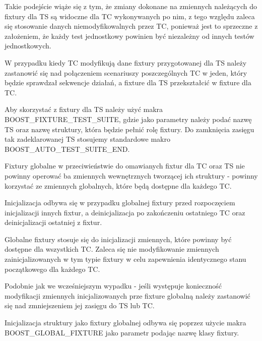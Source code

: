 \documentclass[12pt,a4paper,notitlepage]{report}
\begin{document}
Takie podejście wiąże się z tym, że zmiany dokonane na zmiennych należących do fixtury dla TS są widoczne dla TC wykonywanych po nim, z tego względu zaleca się stosowanie danych niemodyfikowalnych przez TC, ponieważ jest to sprzeczne z założeniem, że każdy test jednostkowy powinien być niezależny od innych testów jednostkowych.

W przypadku kiedy TC modyfikują dane fixtury przygotowanej dla TS należy zastanowić się nad połączeniem scenariuszy poszczególnych TC w jeden, który będzie sprawdzał sekwencje działań, a fixture dla TS przekształcić w fixture dla TC.

Aby skorzystać z fixtury dla TS należy użyć makra BOOST{\_}FIXTURE{\_}TEST{\_}SUITE, gdzie jako parametry należy podać nazwę TS oraz nazwę struktury, która będzie pełnić rolę fixtury. Do zamknięcia zasięgu tak zadeklarowanej TS stosujemy standardowe makro BOOST{\_}AUTO{\_}TEST{\_}SUITE{\_}END.

			

Fixtury globalne w przeciwieństwie do omawianych fixtur dla TC oraz TS nie powinny operować ba zmiennych wewnętrznych tworzącej ich struktury - powinny korzystać ze zmiennych globalnych, które będą dostępne dla każdego TC.

Inicjalizacja odbywa się w przypadku globalnej fixtury przed rozpoczęciem inicjalizacji innych fixtur, a deinicjalizacja po zakończeniu ostatniego TC oraz deinicjalizacji ostatniej z fixtur.

Globalne fixtury stosuje się do inicjalizacji zmiennych, które powinny być dostępne dla wszystkich TC. Zaleca się nie modyfikowanie zmiennych zainicjalizowanych w tym typie fixtury w celu zapewnienia identycznego stanu początkowego dla każdego TC.

Podobnie jak we wcześniejszym wypadku - jeśli występuje konieczność modyfikacji zmiennych inicjalizowanych prze fixture globalną należy zastanowić się nad zmniejszeniem jej zasięgu do TS lub TC.

Inicjalizacja struktury jako fixtury globalnej odbywa się poprzez użycie makra BOOST{\_}GLOBAL{\_}FIXTURE jako parametr podając nazwę klasy fixtury.
\end{document}
